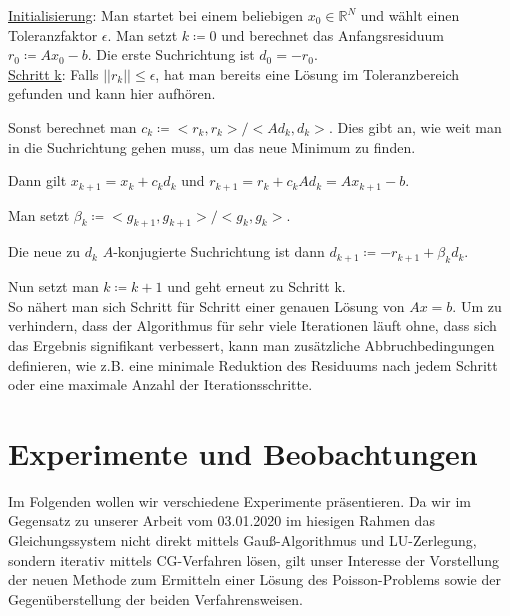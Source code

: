 \documentclass{scrartcl}
\begin{document}
\underline{Initialisierung}: Man startet bei einem beliebigen $x_0\in\mathbb{R}^N$ und wählt einen Toleranzfaktor $\epsilon$.
Man setzt $k\coloneqq 0$ und berechnet das Anfangsresiduum $r_0 \coloneqq Ax_0 - b$. Die erste Suchrichtung ist $d_0 = -r_0$.\\

\underline{Schritt k}: Falls $||r_k||\leq \epsilon$, hat man bereits eine Lösung im Toleranzbereich gefunden und kann hier aufhören.

Sonst berechnet man $c_k \coloneqq <r_k, r_k>/<Ad_k,d_k>$. Dies gibt an, wie weit man in die Suchrichtung gehen muss, um das neue Minimum zu finden.

Dann gilt $x_{k+1} = x_k + c_k d_k$ und $r_{k+1} = r_k + c_k Ad_k = Ax_{k+1} - b$.

Man setzt $\beta_k \coloneqq <g_{k+1},g_{k+1}>/<g_{k},g_{k}>$.

Die neue zu $d_k$ $A$-konjugierte Suchrichtung ist dann $d_{k+1}\coloneqq -r_{k+1} + \beta_k d_k$.

Nun setzt man $k \coloneqq k+1$ und geht erneut zu Schritt k.\\

So nähert man sich Schritt für Schritt einer genauen Lösung von $Ax=b$.
Um zu verhindern, dass der Algorithmus für sehr viele Iterationen läuft ohne, dass sich das Ergebnis signifikant verbessert, kann man zusätzliche Abbruchbedingungen definieren, wie z.B. eine minimale Reduktion des Residuums nach jedem Schritt oder eine maximale Anzahl der Iterationsschritte.

\cite{tischendorf2019}

\pagebreak
\section{Experimente und Beobachtungen}
Im Folgenden wollen wir verschiedene Experimente präsentieren. 
Da wir im Gegensatz zu unserer Arbeit vom 03.01.2020 im hiesigen Rahmen das Gleichungssystem nicht direkt mittels Gauß-Algorithmus und LU-Zerlegung, sondern iterativ mittels CG-Verfahren lösen, gilt unser Interesse der Vorstellung der neuen Methode zum Ermitteln einer Lösung des Poisson-Problems sowie der Gegenüberstellung der beiden Verfahrensweisen.  
\end{document}
